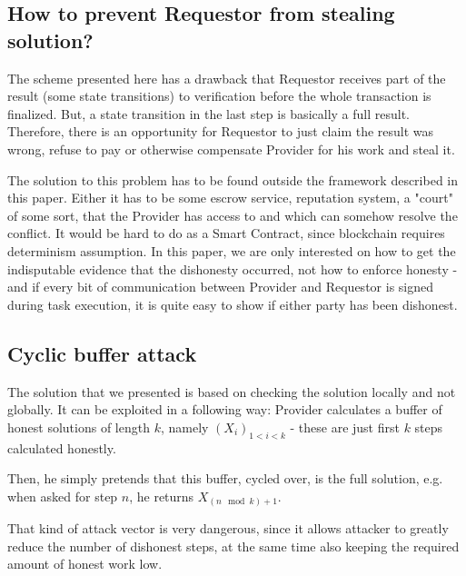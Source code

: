 \documentclass{winnower}
\begin{document}
\subsection{How to prevent Requestor from stealing solution?}
The scheme presented here has a drawback that Requestor receives part of the result (some state transitions) to verification before the whole transaction is finalized. But, a state transition in the last step is basically a full result. Therefore, there is an opportunity for Requestor to just claim the result was wrong, refuse to pay or otherwise compensate Provider for his work and steal it.

The solution to this problem has to be found outside the framework described in this paper. Either it has to be some escrow service, reputation system, a "court" of some sort, that the Provider has access to and which can somehow resolve the conflict. It would be hard to do as a Smart Contract, since blockchain requires determinism assumption. In this paper, we are only interested on how to get the indisputable evidence that the dishonesty occurred, not how to enforce honesty -  and if every bit of communication between Provider and Requestor is signed during task execution, it is quite easy to show if either party has been dishonest.

\subsection{Cyclic buffer attack}
The solution that we presented is based on checking the solution locally and not globally. It can be exploited in a following way: Provider calculates a buffer of honest solutions of length $k$, namely $(X_i)_{1<i<k}$ - these are just first $k$ steps calculated honestly.

Then, he simply pretends that this buffer, cycled over, is the full solution, e.g. when asked for step $n$, he returns $X_{(n \mod k) + 1}$.

That kind of attack vector is very dangerous, since it allows attacker to greatly reduce the number of dishonest steps, at the same time also keeping the required amount of honest work low.
\end{document}
